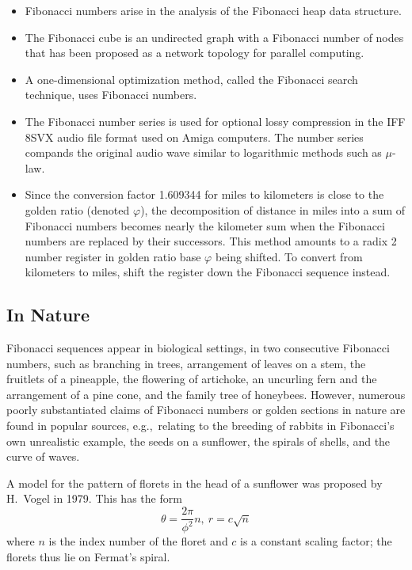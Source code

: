 \begin{itemize}
\item Fibonacci numbers arise in the analysis of the Fibonacci heap data structure.

\item The Fibonacci cube is an undirected graph with a Fibonacci number of nodes that has been proposed as a network topology for parallel computing.

\item A one-dimensional optimization method, called the Fibonacci search technique, uses Fibonacci numbers.

\item The Fibonacci number series is used for optional lossy compression in the IFF 8SVX audio file format used on Amiga computers. The number series compands the original audio wave similar to logarithmic methods such as $\mu$-law.

\item Since the conversion factor 1.609344 for miles to kilometers is close to the golden ratio (denoted $\varphi$), the decomposition of distance in miles into a sum of Fibonacci numbers becomes nearly the kilometer sum when the Fibonacci numbers are replaced by their successors. This method amounts to a radix 2 number register in golden ratio base $\varphi$ being shifted. To convert from kilometers to miles, shift the register down the Fibonacci sequence instead.
\end{itemize}


\subsection{In Nature}

Fibonacci sequences appear in biological settings, in two consecutive Fibonacci numbers, such as branching in trees, arrangement of leaves on a stem, the fruitlets of a pineapple, the flowering of artichoke, an uncurling fern and the arrangement of a pine cone, and the family tree of honeybees. However, numerous poorly substantiated claims of Fibonacci numbers or golden sections in nature are found in popular sources, e.g.,~relating to the breeding of rabbits in Fibonacci's own unrealistic example, the seeds on a sunflower, the spirals of shells, and the curve of waves.

A model for the pattern of florets in the head of a sunflower was proposed by H.~Vogel in 1979. \cite{Vogel:1979} This has the form
\begin{equation}
\theta = \frac{2\pi}{\phi^2} n,\  r = c \sqrt{n}
\end{equation}
where $n$ is the index number of the floret and $c$ is a constant scaling factor; the florets thus lie on Fermat's spiral.

